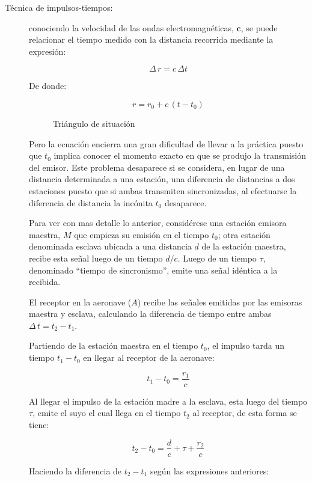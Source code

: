 \begin{description}
\item [T\'ecnica de impulsos-tiempos:] conociendo la velocidad de las ondas electromagn\'eticas, $\mathbf{c}$, se puede relacionar el tiempo medido con la distancia recorrida mediante la expresi\'on:

\[ \Delta\,r = c\,\Delta t
\]

De donde:

\[ r = r_0+c\,\left(t-t_0\right)
\]

\begin{figure}[!h]
 \caption{Tri\'angulo de situaci\'on}
 \label{fig:06.triangulo.situacion}
\end{figure}

Pero la ecuaci\'on encierra una gran dificultad de llevar a la pr\'actica puesto que $t_0$ implica conocer el momento exacto en que se produjo la transmisi\'on del emisor. Este problema desaparece si se considera, en lugar de una distancia determinada a una estaci\'on, una diferencia de distancias a dos estaciones puesto que si ambas transmiten sincronizadas, al efectuarse la diferencia de distancia la inc\'onita $t_0$ desaparece.

Para ver con mas detalle lo anterior, consid\'erese una estaci\'on emisora maestra, $M$  que empieza su emisi\'on en el tiempo $t_0$; otra estaci\'on denominada esclava ubicada a una distancia $d$ de la estaci\'on maestra, recibe esta se\~nal luego de un tiempo $d/c$. Luego de un tiempo $\tau$, denominado ``tiempo de sincronismo'', emite una se\~nal id\'entica a la recibida. 

El receptor en la aeronave ($A$) recibe las se\~nales emitidas por las emisoras maestra y esclava, calculando la diferencia de tiempo entre ambas $\Delta\,t = t_2-t_1$. 

Partiendo de la estaci\'on maestra en el tiempo $t_0$, el impulso tarda un tiempo $t_1-t_0$ en llegar al receptor de la aeronave:

\[t_1-t_0 = \displaystyle \frac{r_1}{c}
\]

Al llegar el impulso de la estaci\'on madre a la esclava, esta luego del tiempo $\tau$, emite el suyo el cual llega en el tiempo $t_2$ al receptor, de esta forma se tiene:

\[
t_2-t_0 = \displaystyle \frac{d}{c}+\tau+\frac{r_2}{c}
\]

Haciendo la diferencia de $t_2-t_1$ seg\'un las expresiones anteriores:


\end{description}
